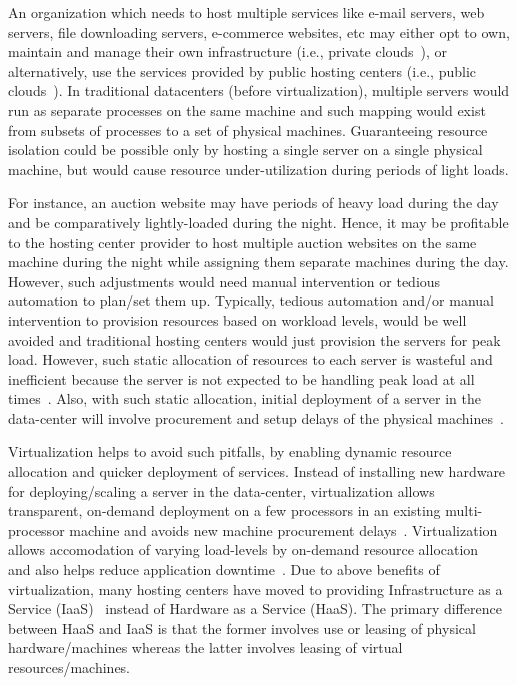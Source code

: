An organization which needs to host multiple services like e-mail servers,
web servers, file downloading servers, e-commerce websites, etc may either opt
to own, maintain and manage their own 
infrastructure (i.e., private 
clouds~\cite{ubuntu-private-cloud}), 
or alternatively, use the services provided by public hosting 
centers (i.e., public clouds~\cite{ec2}). 
In traditional datacenters (before virtualization), multiple
servers would run as separate processes on the same machine and such
mapping would exist from subsets of processes to a set of physical machines.
Guaranteeing resource isolation could be possible only by hosting a single
server on a single physical machine, but would 
cause resource under-utilization
during periods of light loads.

For instance, an auction website may have
periods of heavy load during the day and be comparatively lightly-loaded
during the night. Hence, it may be profitable to the hosting center provider to
host multiple auction websites on the same machine during the night while
assigning them separate machines during the day. However, such adjustments
would need manual intervention or tedious automation to plan/set them up.
Typically, tedious automation and/or manual intervention to provision 
resources based on workload levels, would be well avoided and traditional
hosting centers would just provision the servers for peak load.
However, such static allocation of resources to each server is wasteful
and inefficient because
the server is not expected to be handling peak load at all 
times~\cite{capacity-planning, emerging-research-directions}. Also, with
such static allocation, initial deployment of a server in the data-center
will involve procurement and setup delays of the physical 
machines~\cite{xen-art-of-virtualization}. 

Virtualization helps to avoid
such pitfalls, by enabling dynamic resource allocation and 
quicker deployment
of services. Instead of installing new hardware for deploying/scaling a server
in the data-center, virtualization 
allows transparent, on-demand deployment on a few
processors in an existing multi-processor machine and avoids new machine
procurement delays~\cite{xen-art-of-virtualization}. 
Virtualization allows accomodation of varying load-levels by
on-demand resource allocation~\cite{xen-art-of-virtualization-revisited}
and also helps reduce application downtime~\cite{google-live-migration}. 
Due to above benefits of virtualization, 
many hosting centers have moved to providing 
Infrastructure as a Service (IaaS)~\cite{ec2, azure} instead of
Hardware as a Service (HaaS).
The primary difference between HaaS and IaaS is that the 
former involves use or leasing of physical
hardware/machines whereas the latter involves 
leasing of virtual resources/machines.


